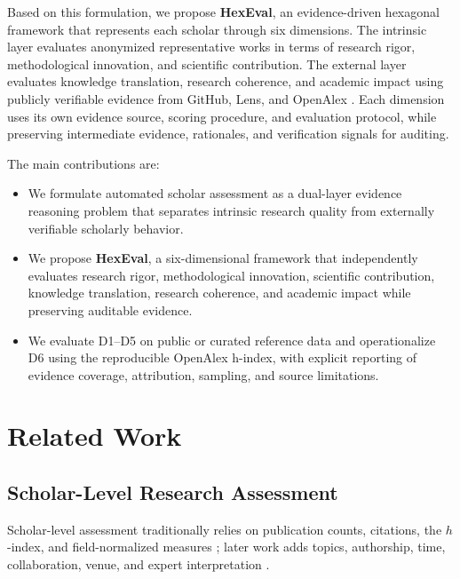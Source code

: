 \documentclass[letterpaper]{article} %
\begin{document}
Based on this formulation, we propose \textbf{HexEval}, an evidence-driven hexagonal framework that represents each scholar through six dimensions. The intrinsic layer evaluates anonymized representative works in terms of research rigor, methodological innovation, and scientific contribution. The external layer evaluates knowledge translation, research coherence, and academic impact using publicly verifiable evidence from GitHub, Lens, and OpenAlex \cite{priem2022openalex}. Each dimension uses its own evidence source, scoring procedure, and evaluation protocol, while preserving intermediate evidence, rationales, and verification signals for auditing.

The main contributions are:

\begin{itemize}
\item We formulate automated scholar assessment as a dual-layer evidence reasoning problem that separates intrinsic research quality from externally verifiable scholarly behavior.

\item We propose \textbf{HexEval}, a six-dimensional framework that independently evaluates research rigor, methodological innovation, scientific contribution, knowledge translation, research coherence, and academic impact while preserving auditable evidence.

\item We evaluate D1--D5 on public or curated reference data and operationalize D6 using the reproducible OpenAlex h-index, with explicit reporting of evidence coverage, attribution, sampling, and source limitations.
\end{itemize}


\section{Related Work}

\subsection{Scholar-Level Research Assessment}

Scholar-level assessment traditionally relies on publication counts, citations, the $h$-index, and field-normalized measures \cite{hirsch2005index,radicchi2008universality}; later work adds topics, authorship, time, collaboration, venue, and expert interpretation \cite{xie2021network,gorraiz2016individual}.
\end{document}
